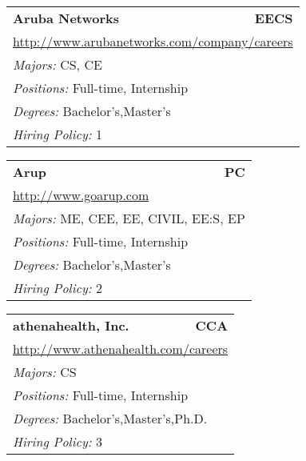 \documentclass[twoside]{article}
\begin{document}
\begin{center}
\begin{multicols}{3}
\begin{FlushLeft}
\begin{minipage}{.9\columnwidth}
\end{minipage}
 
\begin{minipage}{.9\columnwidth}\begin{tabularx}{.95\columnwidth}{Xr}
                 {\Large\bf Aruba Networks} & {\Large\bf EECS}\\
    \multicolumn{2}{p{.95\columnwidth}}{\url{http://www.arubanetworks.com/company/careers}}\\
    \multicolumn{2}{p{.95\columnwidth}}{\emph{Majors:} CS, CE}\\
    \multicolumn{2}{p{.95\columnwidth}}{\emph{Positions:} Full-time, Internship}\\
    \multicolumn{2}{p{.95\columnwidth}}{\emph{Degrees:} Bachelor's,Master's}\\
    \multicolumn{2}{p{.95\columnwidth}}{\emph{Hiring Policy:} 1}\\
    \end{tabularx}
    
\end{minipage}
 
\begin{minipage}{.9\columnwidth}\begin{tabularx}{.95\columnwidth}{Xr}
                 {\Large\bf Arup} & {\Large\bf PC}\\
    \multicolumn{2}{p{.95\columnwidth}}{\url{http://www.goarup.com}}\\
    \multicolumn{2}{p{.95\columnwidth}}{\emph{Majors:} ME, CEE, EE, CIVIL, EE:S, EP}\\
    \multicolumn{2}{p{.95\columnwidth}}{\emph{Positions:} Full-time, Internship}\\
    \multicolumn{2}{p{.95\columnwidth}}{\emph{Degrees:} Bachelor's,Master's}\\
    \multicolumn{2}{p{.95\columnwidth}}{\emph{Hiring Policy:} 2}\\
    \end{tabularx}
    
\end{minipage}
 
\begin{minipage}{.9\columnwidth}\begin{tabularx}{.95\columnwidth}{Xr}
                 {\Large\bf athenahealth, Inc.} & {\Large\bf CCA}\\
    \multicolumn{2}{p{.95\columnwidth}}{\url{http://www.athenahealth.com/careers}}\\
    \multicolumn{2}{p{.95\columnwidth}}{\emph{Majors:} CS}\\
    \multicolumn{2}{p{.95\columnwidth}}{\emph{Positions:} Full-time, Internship}\\
    \multicolumn{2}{p{.95\columnwidth}}{\emph{Degrees:} Bachelor's,Master's,Ph.D.}\\
    \multicolumn{2}{p{.95\columnwidth}}{\emph{Hiring Policy:} 3}\\
    \end{tabularx}
    

\end{minipage}
\end{FlushLeft}
\end{multicols}
\end{center}
\end{document}

